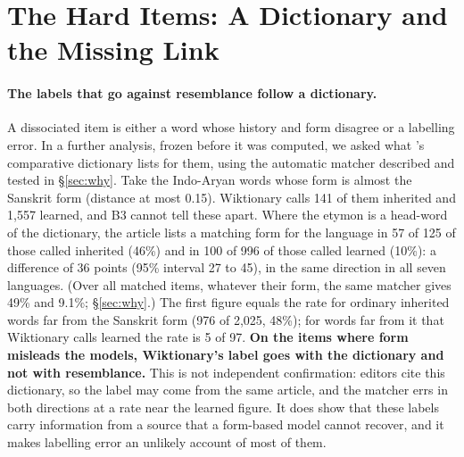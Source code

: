 \documentclass[11pt]{article}
\begin{document}
\section{The Hard Items: A Dictionary and the Missing Link}
\label{sec:link}

\paragraph{The labels that go against resemblance follow a dictionary.} A dissociated item is either a word whose history and form disagree or a labelling error. In a further analysis, frozen before it was computed, we asked what \citeauthor{turner1966cdial}'s comparative dictionary lists for them, using the automatic matcher described and tested in \S\ref{sec:why}. Take the Indo-Aryan words whose form is almost the Sanskrit form (distance at most 0.15). Wiktionary calls 141 of them inherited and 1,557 learned, and B3 cannot tell these apart. Where the etymon is a head-word of the dictionary, the article lists a matching form for the language in 57 of 125 of those called inherited (46\%) and in 100 of 996 of those called learned (10\%): a difference of 36 points (95\% interval 27 to 45), in the same direction in all seven languages. (Over all matched items, whatever their form, the same matcher gives 49\% and 9.1\%; \S\ref{sec:why}.) The first figure equals the rate for ordinary inherited words far from the Sanskrit form (976 of 2,025, 48\%); for words far from it that Wiktionary calls learned the rate is 5 of 97. \textbf{On the items where form misleads the models, Wiktionary's label goes with the dictionary and not with resemblance.} This is not independent confirmation: editors cite this dictionary, so the label may come from the same article, and the matcher errs in both directions at a rate near the learned figure. It does show that these labels carry information from a source that a form-based model cannot recover, and it makes labelling error an unlikely account of most of them.
\end{document}

